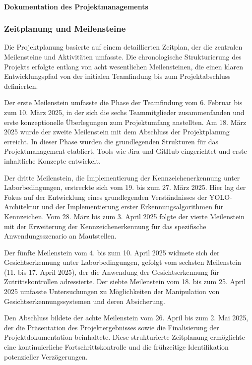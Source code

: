 \paragraph{Dokumentation des Projektmanagements}

\subsubsection{Zeitplanung und Meilensteine}

Die Projektplanung basierte auf einem detaillierten Zeitplan, der die zentralen Meilensteine und Aktivitäten umfasste. Die chronologische Strukturierung des Projekts erfolgte entlang von acht wesentlichen Meilensteinen, die einen klaren Entwicklungspfad von der initialen Teamfindung bis zum Projektabschluss definierten.

Der erste Meilenstein umfasste die Phase der Teamfindung vom 6. Februar bis zum 10. März 2025, in der sich die sechs Teammitglieder zusammenfanden und erste konzeptionelle Überlegungen zum Projektumfang anstellten. Am 18. März 2025 wurde der zweite Meilenstein mit dem Abschluss der Projektplanung erreicht. In dieser Phase wurden die grundlegenden Strukturen für das Projektmanagement etabliert, Tools wie Jira und GitHub eingerichtet und erste inhaltliche Konzepte entwickelt.

Der dritte Meilenstein, die Implementierung der Kennzeichenerkennung unter Laborbedingungen, erstreckte sich vom 19. bis zum 27. März 2025. Hier lag der Fokus auf der Entwicklung eines grundlegenden Verständnisses der YOLO-Architektur und der Implementierung erster Erkennungsalgorithmen für Kennzeichen. Vom 28. März bis zum 3. April 2025 folgte der vierte Meilenstein mit der Erweiterung der Kennzeichenerkennung für das spezifische Anwendungsszenario an Mautstellen.

Der fünfte Meilenstein vom 4. bis zum 10. April 2025 widmete sich der Gesichtserkennung unter Laborbedingungen, gefolgt vom sechsten Meilenstein (11. bis 17. April 2025), der die Anwendung der Gesichtserkennung für Zutrittskontrollen adressierte. Der siebte Meilenstein vom 18. bis zum 25. April 2025 umfasste Untersuchungen zu Möglichkeiten der Manipulation von Gesichtserkennungssystemen und deren Absicherung.

Den Abschluss bildete der achte Meilenstein vom 26. April bis zum 2. Mai 2025, der die Präsentation des Projektergebnisses sowie die Finalisierung der Projektdokumentation beinhaltete. Diese strukturierte Zeitplanung ermöglichte eine kontinuierliche Fortschrittskontrolle und die frühzeitige Identifikation potenzieller Verzögerungen.

